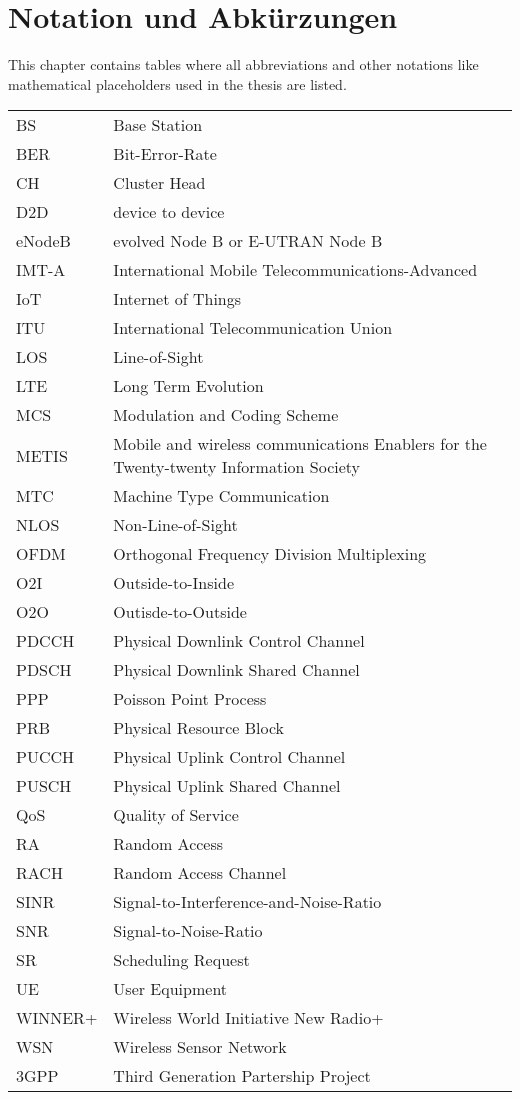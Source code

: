 \chapter{Notation und Abkürzungen}
This chapter contains tables where all abbreviations and other notations like mathematical
placeholders used in the thesis are listed.
\begin{table}[h]
\begin{tabular}{ll}
BS & Base Station\\
BER & Bit-Error-Rate\\
CH & Cluster Head\\
D2D & device to device\\
eNodeB & evolved Node B or E-UTRAN Node B\\
IMT-A & International Mobile Telecommunications-Advanced\\
IoT & Internet of Things\\
ITU & International Telecommunication Union\\
LOS & Line-of-Sight\\
LTE & Long Term Evolution\\
MCS & Modulation and Coding Scheme\\
METIS & Mobile and wireless communications Enablers for the Twenty-twenty Information Society \\
MTC & Machine Type Communication\\
NLOS & Non-Line-of-Sight\\
OFDM & Orthogonal Frequency Division Multiplexing\\
O2I & Outside-to-Inside\\
O2O & Outisde-to-Outside\\
PDCCH & Physical Downlink Control Channel\\
PDSCH & Physical Downlink Shared Channel\\
PPP & Poisson Point Process\\
PRB & Physical Resource Block\\
PUCCH & Physical Uplink Control Channel\\
PUSCH & Physical Uplink Shared Channel\\
QoS & Quality of Service\\
RA & Random Access\\
RACH & Random Access Channel\\
SINR & Signal-to-Interference-and-Noise-Ratio\\
SNR & Signal-to-Noise-Ratio\\ 
SR & Scheduling Request\\
UE & User Equipment\\
WINNER+ & Wireless World Initiative New Radio+ \\
WSN & Wireless Sensor Network\\
3GPP & Third Generation Partership Project\\
\end{tabular}
\end{table}

